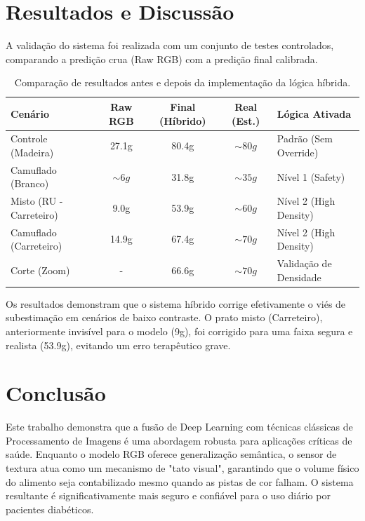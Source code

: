 \documentclass[a4paper,12pt]{article}
\begin{document}
\section{Resultados e Discussão}

A validação do sistema foi realizada com um conjunto de testes controlados, comparando a predição crua (Raw RGB) com a predição final calibrada.

\begin{table}[h]
\centering
\begin{tabular}{|l|c|c|c|l|}
\hline
\textbf{Cenário} & \textbf{Raw RGB} & \textbf{Final (Híbrido)} & \textbf{Real (Est.)} & \textbf{Lógica Ativada} \\
\hline
Controle (Madeira) & 27.1g & 80.4g & $\sim 80g$ & Padrão (Sem Override) \\
Camuflado (Branco) & $\sim 6g$ & 31.8g & $\sim 35g$ & Nível 1 (Safety) \\
Misto (RU - Carreteiro) & 9.0g & 53.9g & $\sim 60g$ & Nível 2 (High Density) \\
Camuflado (Carreteiro) & 14.9g & 67.4g & $\sim 70g$ & Nível 2 (High Density) \\
Corte (Zoom) & - & 66.6g & $\sim 70g$ & Validação de Densidade \\
\hline
\end{tabular}
\caption{Comparação de resultados antes e depois da implementação da lógica híbrida.}
\end{table}

Os resultados demonstram que o sistema híbrido corrige efetivamente o viés de subestimação em cenários de baixo contraste. O prato misto (Carreteiro), anteriormente invisível para o modelo (9g), foi corrigido para uma faixa segura e realista (53.9g), evitando um erro terapêutico grave.

\section{Conclusão}

Este trabalho demonstra que a fusão de Deep Learning com técnicas clássicas de Processamento de Imagens é uma abordagem robusta para aplicações críticas de saúde. Enquanto o modelo RGB oferece generalização semântica, o sensor de textura atua como um mecanismo de "tato visual", garantindo que o volume físico do alimento seja contabilizado mesmo quando as pistas de cor falham. O sistema resultante é significativamente mais seguro e confiável para o uso diário por pacientes diabéticos.
\end{document}
